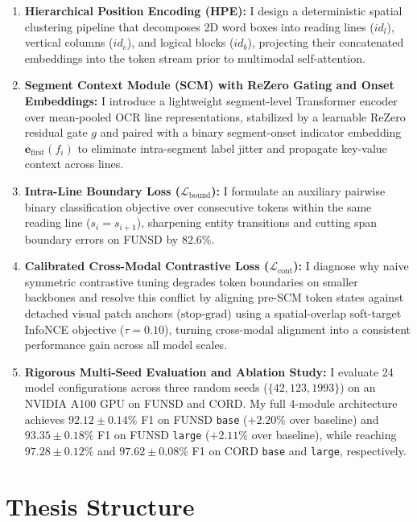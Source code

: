 \begin{enumerate}
    \item \textbf{Hierarchical Position Encoding (HPE):}
    I design a deterministic spatial clustering pipeline that decomposes 2D word boxes into reading lines ($id_l$), vertical columns ($id_c$), and logical blocks ($id_b$), projecting their concatenated embeddings into the token stream prior to multimodal self-attention.

    \item \textbf{Segment Context Module (SCM) with ReZero Gating and Onset Embeddings:}
    I introduce a lightweight segment-level Transformer encoder over mean-pooled OCR line representations, stabilized by a learnable ReZero residual gate $g$ and paired with a binary segment-onset indicator embedding $\mathbf{e}_{\text{first}}(f_i)$ to eliminate intra-segment label jitter and propagate key-value context across lines.

    \item \textbf{Intra-Line Boundary Loss ($\mathcal{L}_{\text{bound}}$):}
    I formulate an auxiliary pairwise binary classification objective over consecutive tokens within the same reading line ($s_i = s_{i+1}$), sharpening entity transitions and cutting span boundary errors on FUNSD by $82.6\%$.

    \item \textbf{Calibrated Cross-Modal Contrastive Loss ($\mathcal{L}_{\text{cont}}$):}
    I diagnose why naive symmetric contrastive tuning degrades token boundaries on smaller backbones and resolve this conflict by aligning pre-SCM token states against detached visual patch anchors ($\text{stop-grad}$) using a spatial-overlap soft-target InfoNCE objective ($\tau = 0.10$), turning cross-modal alignment into a consistent performance gain across all model scales.

    \item \textbf{Rigorous Multi-Seed Evaluation and Ablation Study:}
    I evaluate 24 model configurations across three random seeds ($\{42, 123, 1993\}$) on an NVIDIA A100 GPU on FUNSD and CORD. My full 4-module architecture achieves $92.12 \pm 0.14\%$ F1 on FUNSD \texttt{base} ($+2.20\%$ over baseline) and $93.35 \pm 0.18\%$ F1 on FUNSD \texttt{large} ($+2.11\%$ over baseline), while reaching $97.28 \pm 0.12\%$ and $97.62 \pm 0.08\%$ F1 on CORD \texttt{base} and \texttt{large}, respectively.
\end{enumerate}

\section{Thesis Structure}
\label{sec:thesis_structure}

